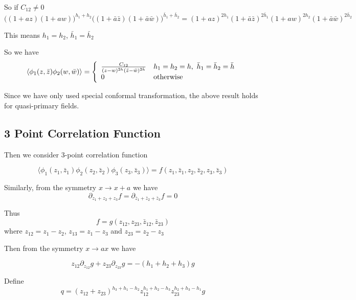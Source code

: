 \documentclass[12pt]{book}
\begin{document}
	So if $C_{12}\neq 0$
	\begin{equation}
		\big((1+az)(1+aw)\big)^{h_1+h_2}\big((1+\bar a\bar z)(1+\bar a\bar w)\big)^{\bar h_1+\bar h_2}=(1+az)^{2h_1}(1+\bar a\bar z)^{2\bar h_1}(1+aw)^{2h_2}(1+\bar a\bar w)^{2\bar h_2}
	\end{equation}
	
	This means $h_1=h_2$, $\bar h_1=\bar h_2$
	
	So we have
	\begin{equation}
		\langle \phi_1(z,\bar z)\phi_2(w,\bar w)\rangle=\left\{\begin{array}{ll}
			\frac {C_{12}}{(z-w)^{2h}(\bar z-\bar w)^{2\bar h}}& h_1=h_2=h,\ \bar h_1=\bar h_2=\bar h\\
			0& {\rm otherwise}
		\end{array} \right.
	\end{equation}
	
	Since we have only used special conformal transformation, the above result holds for quasi-primary fields.
	
	\subsection{3 Point Correlation Function}
	Then we consider 3-point correlation function
	
	\begin{equation}
		\langle\phi_1(z_1,\bar z_1)\phi_2(z_2,\bar z_2)\phi_3(z_3,\bar z_3)\rangle=f(z_1,\bar z_1,z_2,\bar z_2,z_3,\bar z_3)
	\end{equation}
	
	Similarly, from the symmetry $x\rightarrow x+a$ we have
	\begin{equation}
		\partial_{z_1+z_2+z_3}f=\partial_{\bar z_1+\bar z_2+\bar z_3}f=0
	\end{equation}
	
	Thus
	\begin{equation}
		f=g(z_{12},z_{23},\bar z_{12},\bar z_{23})
	\end{equation}
	where $z_{12}=z_1-z_2$, $z_{13}=z_1-z_3$ and $z_{23}=z_2-z_3$
	
	Then from the symmetry $x\rightarrow ax$ we have
	
	\begin{equation}
		z_{12}\partial_{z_{12}}g+z_{23}\partial_{z_{23}}g=-(h_1+h_2+h_3)g
	\end{equation}
	
	Define
	\begin{equation}
		q=(z_{12}+z_{23})^{h_3+h_1-h_2}z_{12}^{h_1+h_2-h_3}z_{23}^{h_2+h_3-h_1}g
	\end{equation}
	
\end{document}
